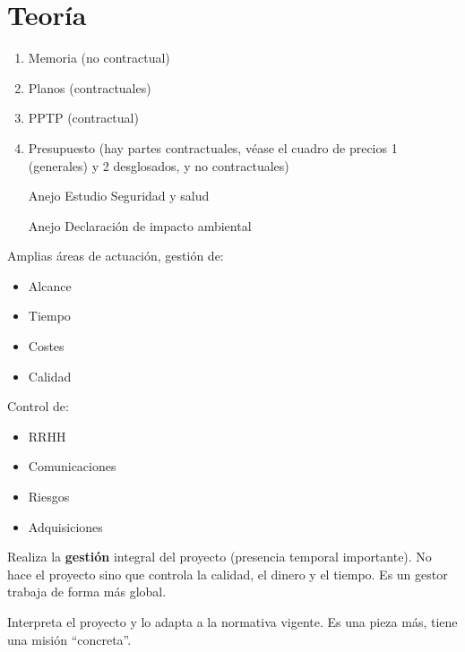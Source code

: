 \section{Teoría} %
\label{sec:proyectos}

\begin{mydef}
	\begin{enumerate}
		\item Memoria (no contractual)
		\item Planos (contractuales)
		\item PPTP (contractual)
		\item Presupuesto (hay partes contractuales, véase el cuadro de precios 1 (generales) y 2 desglosados,  y no contractuales)
		\item [Anejo] Estudio Seguridad y salud
		\item [Anejo] Declaración de impacto ambiental
	\end{enumerate}
\end{mydef}

\begin{mydef}
	Amplias áreas de actuación, gestión de: 
	\begin{itemize}
		\item Alcance 
		\item Tiempo
		\item Costes 
		\item Calidad
	\end{itemize}
	Control de: 
	\begin{itemize}
		\item RRHH
		\item Comunicaciones
		\item Riesgos
		\item Adquisiciones
	\end{itemize}
\end{mydef}

\begin{mydef}
	Realiza la \textbf{gestión} integral del proyecto (presencia temporal importante). No hace el proyecto sino que controla la calidad, el dinero y el tiempo. Es un gestor trabaja de forma más global.
\end{mydef}

\begin{mydef}
	Interpreta el proyecto y lo adapta a la normativa vigente. Es una pieza más, tiene una misión ``concreta''.
\end{mydef}

